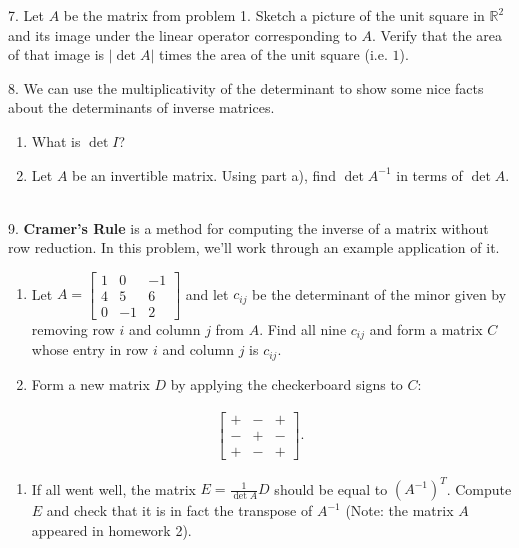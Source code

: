 \documentclass{article}
\begin{document}
7. Let $A$ be the matrix from problem 1. Sketch a picture of the unit square in $\mathbb{R}^2$ and its image under the linear operator corresponding to $A$. Verify that the area of that image is $|\det A|$ times the area of the unit square (i.e. $1$).

8. We can use the multiplicativity of the determinant to show some nice facts about the determinants of inverse matrices.

\begin{enumerate}

	\item What is $\det I$?

	\item Let $A$ be an invertible matrix. Using part a), find $\det A^{-1}$ in terms of $\det A$.

\end{enumerate}

~\\

9. \textbf{Cramer's Rule} is a method for computing the inverse of a matrix without row reduction. In this problem, we'll work through an example application of it.

\begin{enumerate}

	\item Let $\displaystyle A = \left[\begin{array}{ccc}1& 0& -1 \\ 4& 5& 6 \\ 0& -1& 2\end{array}\right]$ and let $c_{ij}$ be the determinant of the minor given by removing row $i$ and column $j$ from $A$. Find all nine $c_{ij}$ and form a matrix $C$ whose entry in row $i$ and column $j$ is $c_{ij}$.

	\item Form a new matrix $D$ by applying the checkerboard signs to $C$:

\end{enumerate}

\begin{align*}
	\left[\begin{array}{ccc} +& -& + \\ -& +& - \\ +& -& + \end{array}\right].
\end{align*}

\begin{enumerate}

	\item If all went well, the matrix $E = \frac{1}{\det A} D$ should be equal to $(A^{-1})^T$. Compute $E$ and check that it is in fact the transpose of $A^{-1}$ (Note: the matrix $A$ appeared in homework 2).

\end{enumerate}
\end{document}
